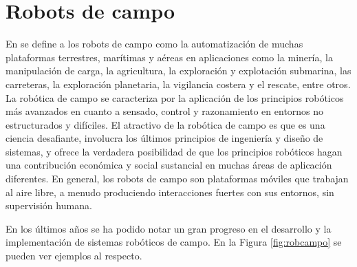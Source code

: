 \section{Robots de campo}

En \cite{thorpe2003field} se define a los robots de campo como la automatización de muchas plataformas terrestres, marítimas y aéreas en aplicaciones como la minería, la manipulación de carga, la agricultura, la exploración y explotación submarina, las carreteras, la exploración planetaria, la vigilancia costera y el rescate, entre otros. La robótica de campo se caracteriza por la aplicación de los principios robóticos más avanzados en cuanto a sensado, control y razonamiento en entornos no estructurados y difíciles. El atractivo de la robótica de campo es que es una ciencia desafiante, involucra los últimos principios de ingeniería y diseño de sistemas, y ofrece la verdadera posibilidad de que los principios robóticos hagan una contribución económica y social sustancial en muchas áreas de aplicación diferentes. En general, los robots de campo son plataformas móviles que trabajan al aire libre, a menudo produciendo interacciones fuertes con sus entornos, sin supervisión humana.

En los últimos años se ha podido notar un gran progreso en el desarrollo y la implementación de sistemas robóticos de campo. En la Figura \ref{fig:robcampo} se pueden ver ejemplos al respecto. \\


